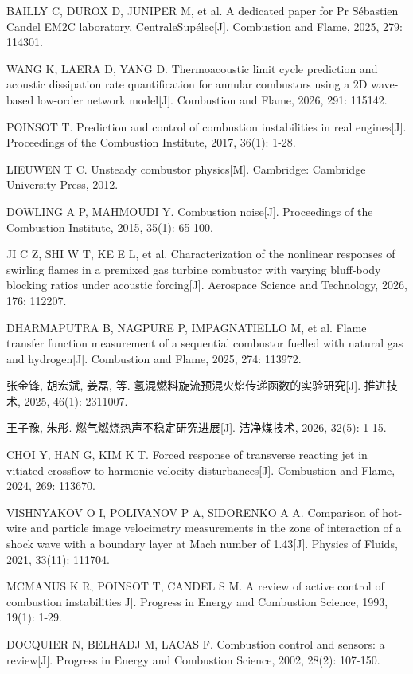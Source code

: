 \documentclass[UTF8,a4paper,zihao=-4,fontset=windows]{ctexart}
\begin{document}
{\begin{enumerate}[label={[\arabic*]}, leftmargin=2.2em,
  labelsep=0.2em, itemsep=0pt, parsep=0pt, topsep=2pt, partopsep=0pt]
\item BAILLY C, DUROX D, JUNIPER M, et al. A dedicated paper for Pr Sébastien Candel EM2C laboratory, CentraleSupélec[J]. Combustion and Flame, 2025, 279: 114301.
\item WANG K, LAERA D, YANG D. Thermoacoustic limit cycle prediction and acoustic dissipation rate quantification for annular combustors using a 2D wave-based low-order network model[J]. Combustion and Flame, 2026, 291: 115142.
\item POINSOT T. Prediction and control of combustion instabilities in real engines[J]. Proceedings of the Combustion Institute, 2017, 36(1): 1-28.
\item LIEUWEN T C. Unsteady combustor physics[M]. Cambridge: Cambridge University Press, 2012.
\item DOWLING A P, MAHMOUDI Y. Combustion noise[J]. Proceedings of the Combustion Institute, 2015, 35(1): 65-100.
\item JI C Z, SHI W T, KE E L, et al. Characterization of the nonlinear responses of swirling flames in a premixed gas turbine combustor with varying bluff-body blocking ratios under acoustic forcing[J]. Aerospace Science and Technology, 2026, 176: 112207.
\item DHARMAPUTRA B, NAGPURE P, IMPAGNATIELLO M, et al. Flame transfer function measurement of a sequential combustor fuelled with natural gas and hydrogen[J]. Combustion and Flame, 2025, 274: 113972.
\item 张金锋, 胡宏斌, 姜磊, 等. 氢混燃料旋流预混火焰传递函数的实验研究[J]. 推进技术, 2025, 46(1): 2311007.
\item 王子豫, 朱彤. 燃气燃烧热声不稳定研究进展[J]. 洁净煤技术, 2026, 32(5): 1-15.
\item CHOI Y, HAN G, KIM K T. Forced response of transverse reacting jet in vitiated crossflow to harmonic velocity disturbances[J]. Combustion and Flame, 2024, 269: 113670.
\item VISHNYAKOV O I, POLIVANOV P A, SIDORENKO A A. Comparison of hot-wire and particle image velocimetry measurements in the zone of interaction of a shock wave with a boundary layer at Mach number of 1.43[J]. Physics of Fluids, 2021, 33(11): 111704.
\item MCMANUS K R, POINSOT T, CANDEL S M. A review of active control of combustion instabilities[J]. Progress in Energy and Combustion Science, 1993, 19(1): 1-29.
\item DOCQUIER N, BELHADJ M, LACAS F. Combustion control and sensors: a review[J]. Progress in Energy and Combustion Science, 2002, 28(2): 107-150.

\end{enumerate}}
\end{document}

